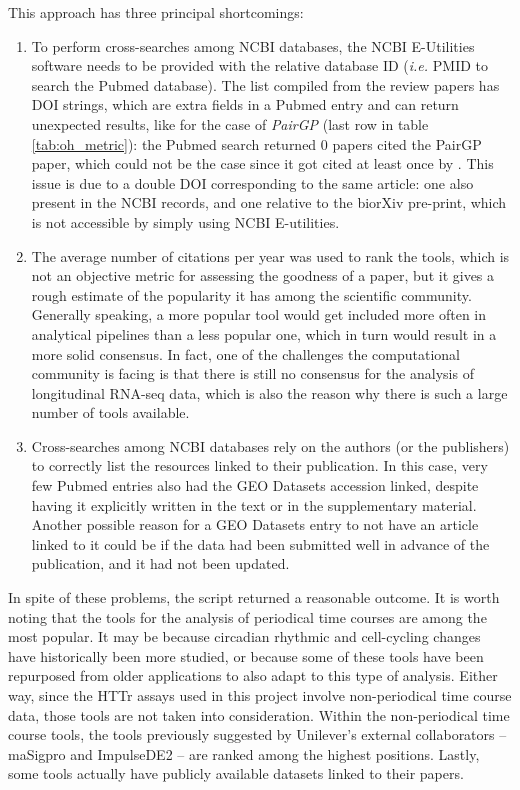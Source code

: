 This approach has three principal shortcomings:
\begin{enumerate}
    \item To perform cross-searches among NCBI databases, the NCBI E-Utilities software needs to be provided with the relative database ID (\textit{i.e.} PMID to search the Pubmed database). The list compiled from the review papers has DOI strings, which are extra fields in a Pubmed entry and can return unexpected results, like for the case of \emph{PairGP} (last row in table \ref{tab:oh_metric}): the Pubmed search returned 0 papers cited the PairGP paper, which could not be the case since it got cited at least once by \citeauthor{ohTemporalDynamicMethods2021}. This issue is due to a double DOI corresponding to the same article: one also present in the NCBI records, and one relative to the biorXiv pre-print, which is not accessible by simply using NCBI E-utilities.
    \item The average number of citations per year was used to rank the tools, which is not an objective metric for assessing the goodness of a paper, but it gives a rough estimate of the popularity it has among the scientific community. Generally speaking, a more popular tool would get included more often in analytical pipelines than a less popular one, which in turn would result in a more solid consensus. In fact, one of the challenges the computational community is facing is that there is still no consensus for the analysis of longitudinal RNA-seq data, which is also the reason why there is such a large number of tools available.
    \item Cross-searches among NCBI databases rely on the authors (or the publishers) to correctly list the resources linked to their publication. In this case, very few Pubmed entries also had the GEO Datasets accession linked, despite having it explicitly written in the text or in the supplementary material. Another possible reason for a GEO Datasets entry to not have an article linked to it could be if the data had been submitted well in advance of the publication, and it had not been updated.
\end{enumerate}

In spite of these problems, the script returned a reasonable outcome. It is worth noting that the tools for the analysis of periodical time courses are among the most popular. It may be because circadian rhythmic and cell-cycling changes have historically been more studied, or because some of these tools have been repurposed from older applications to also adapt to this type of analysis. Either way, since the HTTr assays used in this project involve non-periodical time course data, those tools are not taken into consideration. Within the non-periodical time course tools, the tools previously suggested by Unilever's external collaborators -- maSigpro and ImpulseDE2 -- are ranked among the highest positions. Lastly, some tools actually have publicly available datasets linked to their papers.

